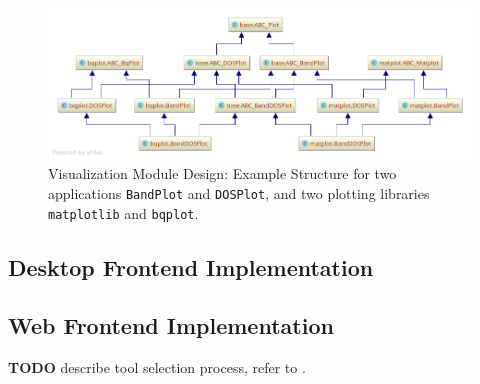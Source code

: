 \begin{figure}[htb!]
    \centering
    \includegraphics[width=1.0\linewidth]{img/pycharm_uml/matplot.png}
    \caption{Visualization Module Design: Example Structure for two applications
    \texttt{BandPlot} and \texttt{DOSPlot}, and two plotting libraries
    \texttt{matplotlib} and \texttt{bqplot}.}
    \label{fig:visualization-module}
\end{figure}

\subsection{Desktop Frontend Implementation}
\label{sec:desktop-frontend}

\subsection{Web Frontend Implementation}
\label{sec:web-frontend}

\textbf{TODO} describe tool selection process, refer to \cite{jw-notes}.





